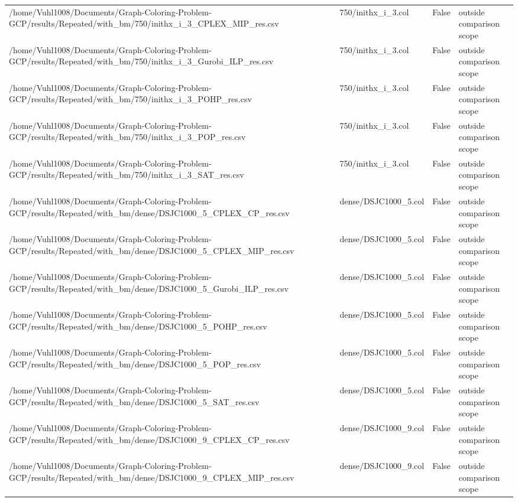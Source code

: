 \begin{table}[htbp]
\begin{tabular}{llll}
/home/Vuhl1008/Documents/Graph-Coloring-Problem-GCP/results/Repeated/with\_bm/750/inithx\_i\_3\_CPLEX\_MIP\_res.csv & 750/inithx\_i\_3.col & False & outside comparison scope \\
/home/Vuhl1008/Documents/Graph-Coloring-Problem-GCP/results/Repeated/with\_bm/750/inithx\_i\_3\_Gurobi\_ILP\_res.csv & 750/inithx\_i\_3.col & False & outside comparison scope \\
/home/Vuhl1008/Documents/Graph-Coloring-Problem-GCP/results/Repeated/with\_bm/750/inithx\_i\_3\_POHP\_res.csv & 750/inithx\_i\_3.col & False & outside comparison scope \\
/home/Vuhl1008/Documents/Graph-Coloring-Problem-GCP/results/Repeated/with\_bm/750/inithx\_i\_3\_POP\_res.csv & 750/inithx\_i\_3.col & False & outside comparison scope \\
/home/Vuhl1008/Documents/Graph-Coloring-Problem-GCP/results/Repeated/with\_bm/750/inithx\_i\_3\_SAT\_res.csv & 750/inithx\_i\_3.col & False & outside comparison scope \\
/home/Vuhl1008/Documents/Graph-Coloring-Problem-GCP/results/Repeated/with\_bm/dense/DSJC1000\_5\_CPLEX\_CP\_res.csv & dense/DSJC1000\_5.col & False & outside comparison scope \\
/home/Vuhl1008/Documents/Graph-Coloring-Problem-GCP/results/Repeated/with\_bm/dense/DSJC1000\_5\_CPLEX\_MIP\_res.csv & dense/DSJC1000\_5.col & False & outside comparison scope \\
/home/Vuhl1008/Documents/Graph-Coloring-Problem-GCP/results/Repeated/with\_bm/dense/DSJC1000\_5\_Gurobi\_ILP\_res.csv & dense/DSJC1000\_5.col & False & outside comparison scope \\
/home/Vuhl1008/Documents/Graph-Coloring-Problem-GCP/results/Repeated/with\_bm/dense/DSJC1000\_5\_POHP\_res.csv & dense/DSJC1000\_5.col & False & outside comparison scope \\
/home/Vuhl1008/Documents/Graph-Coloring-Problem-GCP/results/Repeated/with\_bm/dense/DSJC1000\_5\_POP\_res.csv & dense/DSJC1000\_5.col & False & outside comparison scope \\
/home/Vuhl1008/Documents/Graph-Coloring-Problem-GCP/results/Repeated/with\_bm/dense/DSJC1000\_5\_SAT\_res.csv & dense/DSJC1000\_5.col & False & outside comparison scope \\
/home/Vuhl1008/Documents/Graph-Coloring-Problem-GCP/results/Repeated/with\_bm/dense/DSJC1000\_9\_CPLEX\_CP\_res.csv & dense/DSJC1000\_9.col & False & outside comparison scope \\
/home/Vuhl1008/Documents/Graph-Coloring-Problem-GCP/results/Repeated/with\_bm/dense/DSJC1000\_9\_CPLEX\_MIP\_res.csv & dense/DSJC1000\_9.col & False & outside comparison scope \\

\end{tabular}
\end{table}
